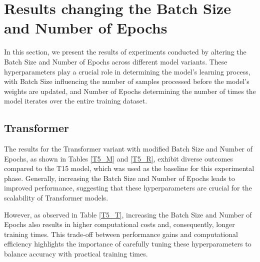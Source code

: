 \section{Results changing the Batch Size and Number of Epochs}
In this section, we present the results of experiments conducted by altering the Batch Size and Number of Epochs across different model variants. These hyperparameters play a crucial role in determining the model's learning process, with Batch Size influencing the number of samples processed before the model’s weights are updated, and Number of Epochs determining the number of times the model iterates over the entire training dataset.

\subsection{Transformer}
The results for the Transformer variant with modified Batch Size and Number of Epochs, as shown in Tables \ref{T5_M} and \ref{T5_R}, exhibit diverse outcomes compared to the T15 model, which was used as the baseline for this experimental phase. Generally, increasing the Batch Size and Number of Epochs leads to improved performance, suggesting that these hyperparameters are crucial for the scalability of Transformer models.

However, as observed in Table \ref{T5_T}, increasing the Batch Size and Number of Epochs also results in higher computational costs and, consequently, longer training times. This trade-off between performance gains and computational efficiency highlights the importance of carefully tuning these hyperparameters to balance accuracy with practical training times.
    

    

